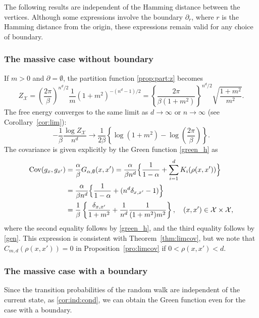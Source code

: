 \documentclass[a4paper,11pt]{article}
\theoremstyle{plain}
\theoremstyle{definition}
\begin{document}
The following results are independent of the Hamming
distance between the vertices. Although some expressions
involve the boundary $\partial_r$, where $r$ is
the Hamming distance from the origin, these expressions
remain valid for any choice of boundary.

\subsubsection{The massive case without boundary}

If $m>0$ and $\partial=\emptyset$, the partition
function \eqref{prop:part:z} becomes
\[
  Z_\mathcal{X}=
  \left(\frac{2\pi}{\beta}\right)^{n^d/2}
  \frac{1}{m}(1+m^2)^{-(n^d-1)/2}
  =\left\{\frac{2\pi}{\beta(1+m^2)}\right\}^{n^d/2}
  \sqrt{\frac{1+m^2}{m^2}}.
\]
The free energy converges to the same limit as $d\to\infty$
or $n\to\infty$ (see Corollary~\ref{cor:lim}):
\[
  -\frac{1}{\beta}\frac{\log Z_{\mathcal{X}}}{n^d}\to
  \frac{1}{2\beta}\left\{\log(1+m^2)-
  \log\left(\frac{2\pi}{\beta}\right)\right\}.
\]
The covariance is given explicitly by the Green
function \eqref{green_h} as 
\begin{align*}
  {\rm Cov}(g_x,g_{x'})
  &=\frac{\alpha}{\beta}G_{\alpha,\emptyset}(x,x')
  =\frac{\alpha}{\beta n^d}\Big\{
  \frac{1}{1-\alpha}+\sum_{i=1}^d K_i
  (\rho(x,x'))\Big\}\\
  &=\frac{\alpha}{\beta n^d}\Big\{\frac{1}{1-\alpha}+(n^d\delta_{x,x'}-1)
  \Big\}\\
  &=\frac{1}{\beta}\left\{\frac{\delta_{x,x'}}{1+m^2}+\frac{1}{n^d}
  \frac{1}{(1+m^2)m^2}\right\}, \quad (x,x')\in\mathcal{X}\times\mathcal{X},
\end{align*}
where the second equality follows by \eqref{green_h},
and the third equality follows by \eqref{gen}.
This expression is consistent with
Theorem~\ref{thm:limcov}, but we note that
$C_{m,d}(\rho(x,x'))=0$ in Proposition~\ref{pro:limcov}
if $0<\rho(x,x')<d$.

\subsubsection{The massive case with a boundary}

Since the transition probabilities of the random walk
are independent of the current state, as
\eqref{cor:ind:cond}, we can obtain the Green function
even for the case with a boundary.
\end{document}
